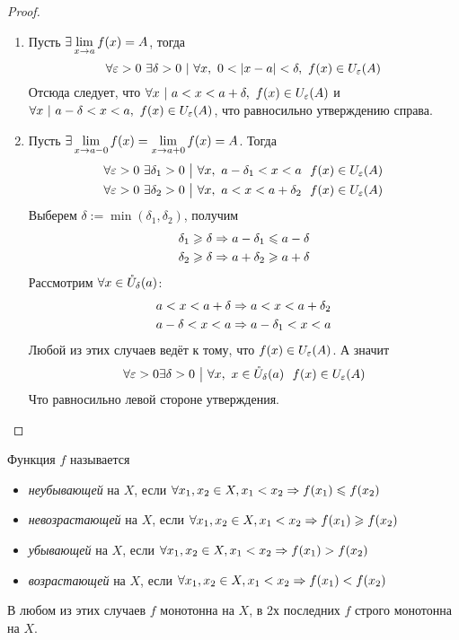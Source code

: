 \begin{proof}
\begin{enumerate}
	\item Пусть $\exists \lim\limits_{x \to a} f(x) = A$, тогда
	$$
		\forall \eps > 0\ \exists \delta > 0\ |\ \forall x,\ 0 < |x - a| < \delta,\ f(x) \in U_{\eps}(A)
	$$
	Отсюда следует, что $\forall x\ |\ a < x < a + \delta,\ f(x) \in U_{\varepsilon}(A)$ и $\forall x\ |\ a - \delta < x < a,\ f(x) \in U_{\varepsilon}(A)$, что равносильно утверждению справа.
	
	\item Пусть $\exists \lim\limits_{x \to a-0} f(x) = \lim\limits_{x \to a+0} f(x) = A$. Тогда
	\begin{align*}
		\forall \varepsilon > 0\ \exists \delta_1 > 0 \ \big|\  \forall x,\ a - \delta_1 < x < a\ \ f(x) \in U_{\varepsilon}(A)
		\\
		\forall \varepsilon > 0\ \exists \delta_2 > 0 \ \big|\  \forall x,\ a < x < a + \delta_2\ \ f(x) \in U_{\varepsilon}(A)
	\end{align*}
	Выберем $\delta := \min(\delta_1, \delta_2)$, получим
	\begin{align*}
		\delta_1 \geqslant \delta \Rightarrow a - \delta_1 \leqslant a - \delta
		\\
		\delta_2 \geqslant \delta \Rightarrow a + \delta_2 \geqslant a + \delta
	\end{align*}
	Рассмотрим $\forall x \in \mathring{U}_\delta(a)$:
	\begin{align*}
		a < x < a + \delta \Rightarrow a < x < a + \delta_2
		\\
		a - \delta < x < a \Rightarrow a - \delta_1 < x < a
	\end{align*}
	Любой из этих случаев ведёт к тому, что $f(x) \in U_{\varepsilon}(A)$. А значит
	\[
		\forall \varepsilon > 0 \exists \delta > 0 \ \big|\  \forall x,\ x \in \mathring{U}_{\delta}(a)\ \ f(x) \in U_{\varepsilon}(A)
	\]
	Что равносильно левой стороне утверждения.
\end{enumerate}

\end{proof}

\begin{definition}
	Функция $f$ называется
	\begin{itemize}
		\item \textit{неубывающей} на $X$, если $\forall x_1, x_2 \in X, x_1 < x_2 \Rightarrow f(x_1) \leqslant f(x_2)$
		\item \textit{невозрастающей} на $X$, если $\forall x_1, x_2 \in X, x_1 < x_2 \Rightarrow f(x_1) \geqslant f(x_2)$
		\item \textit{убывающей} на $X$, если $\forall x_1, x_2 \in X, x_1 < x_2 \Rightarrow f(x_1) > f(x_2)$
		\item \textit{возрастающей} на $X$, если $\forall x_1, x_2 \in X, x_1 < x_2 \Rightarrow f(x_1) < f(x_2)$
	\end{itemize}
	В любом из этих случаев $f$ монотонна на $X$, в 2х последних $f$ строго монотонна на $X$.
\end{definition}

